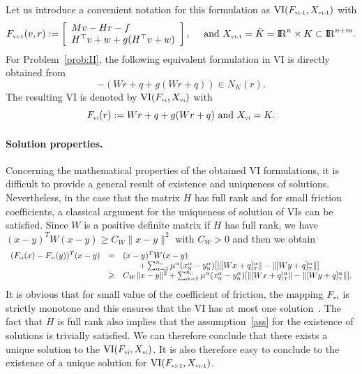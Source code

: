 Let us introduce a convenient notation for this formulation as $\mathrm{VI}(F_{{\hbox{\tiny{vi-1}}}},X_{{\hbox{\tiny{vi-1}}}})$ with
\begin{equation}
  \label{eq:vi-I}
  F_{\vione}(v,r) := \left[\begin{array}{l}
    M v-H r-f \\
    H^\top v+w  + g(H^\top v +w)
  \end{array}\right],\quad \text{ and } X_{\vione} = \bar K = \RR^n \times K\subset \RR^{n+m}.
\end{equation}
For Problem~\ref{prob:II}, the following equivalent formulation in VI is directly obtained from
\begin{equation}
  \label{eq:inclusion-1}
  -(W r + q + g(Wr+q))  \in N_K(r).
\end{equation}
 The resulting VI is denoted by $\mathrm{VI}(F_{{\hbox{\tiny{vi}}}},X_{{\hbox{\tiny{vi}}}})$ with
\begin{equation}
  \label{eq:vi-II}
  F_{\vitwo}(r) := W r +q + g(Wr+q)\text{ and } X_{\vitwo} = K.
\end{equation}

\paragraph{Solution properties.} 
Concerning the mathematical properties of the obtained VI formulations, it is difficult to provide a general result of existence and uniqueness of solutions. Nevertheless, in the case that the matrix $H$ has full rank and for small friction coefficients, a classical argument for the uniqueness of solution of VIs can be satisfied. Since $W$ is a positive definite matrix if $H$ has full rank, we have  $(x-y)^T W (x-y) \geq C_W \|x-y\|^2$ with  $C_W>0$ and then we obtain
\begin{equation}
  \label{eq:mono-II}
  \begin{array}{rcl}
    (F_{\vitwo}(x)-F_{\vitwo}(y))^T(x-y) &=& (x-y)^T W (x-y)  \\
    &  & \quad\quad + \sum _{\alpha =1}^{n_c} \mu^\alpha (x^\alpha_\n-y^\alpha_\n) [\|[Wx+q]^\alpha_\t \| - \|[Wy+q]^\alpha_\t \|] \\
    & \geq & C_W \|x-y\|^2  + \sum _{\alpha =1}^{n_c} \mu^\alpha (x^\alpha_\n-y^\alpha_\n) [\|[Wx+q]^\alpha_\t \| - \|[Wy+q]^\alpha_\t \|].
  \end{array}
\end{equation}
It is obvious that for small value of the coefficient of friction, the mapping $F_{\hbox{\tiny{vi}}}$ is strictly monotone and this ensures that the VI has at most one solution~\citep[Theorem 2.3.3]{Facchinei.Pang2003}. The fact that $H$ is full rank also implies that the assumption~\eqref{ass} for the existence of solutions is trivially satisfied. We can therefore conclude that there exists a unique solution to the $\mathrm{VI}(F_{{\hbox{\tiny{vi}}}},X_{{\hbox{\tiny{vi}}}})$. It is also therefore easy to conclude to the existence of a unique solution for  $\mathrm{VI}(F_{{\hbox{\tiny{vi-1}}}},X_{{\hbox{\tiny{vi-1}}}})$.



